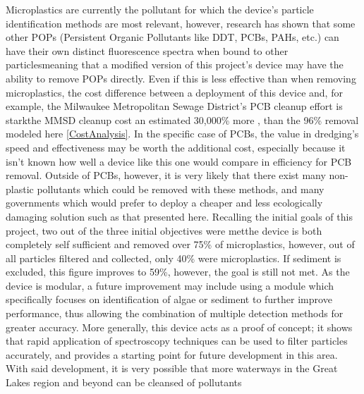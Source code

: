 \documentclass[fleqn,10pt]{SelfArx} %
\begin{document}
	Microplastics are currently the pollutant for which the device's particle identification methods are most relevant, however, research has shown that some other POPs (Persistent Organic Pollutants like DDT, PCBs, PAHs, etc.) can have their own distinct fluorescence spectra when bound to other particles\textemdash meaning that a modified version of this project's device may have the ability to remove POPs directly. Even if this is less effective than when removing microplastics, the cost difference between a deployment of this device and, for example, the Milwaukee Metropolitan Sewage District's PCB cleanup effort is stark\textemdash the MMSD cleanup cost an estimated 30,000\% more \cite{Fowlkes_2025}, than the 96\% removal modeled here \ref{CostAnalysis}. In the specific case of PCBs, the value in dredging's speed and effectiveness may be worth the additional cost, especially because it isn't known how well a device like this one would compare in efficiency for PCB removal. Outside of PCBs, however, it is very likely that there exist many non-plastic pollutants which could be removed with these methods, and many governments which would prefer to deploy a cheaper and less ecologically damaging solution such as that presented here.
	\linebreak
	Recalling the initial goals of this project, two out of the three initial objectives were met\textemdash the device is both completely self sufficient and removed over 75\% of microplastics, however, out of all particles filtered and collected, only 40\% were microplastics. If sediment is excluded, this figure improves to 59\%, however, the goal is still not met. As the device is modular, a future improvement may include using a module which specifically focuses on identification of algae or sediment to further improve performance, thus allowing the combination of multiple detection methods for greater accuracy. More generally, this device acts as a proof of concept; it shows that rapid application of spectroscopy techniques can be used to filter particles accurately, and provides a starting point for future development in this area. With said development, it is very possible that more waterways in the Great Lakes region and beyond can be cleansed of pollutants\textemdash 
	
\end{document}
